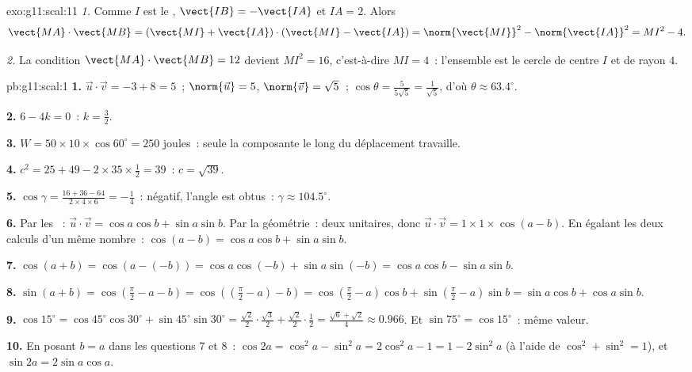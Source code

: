 \begin{solution}{exo:g11:scal:11}
\emph{1.} Comme $I$ est le , $\vect{IB} = -\vect{IA}$ et
$IA = 2$. Alors
\[
\vect{MA}\cdot\vect{MB}
= (\vect{MI} + \vect{IA})\cdot(\vect{MI} - \vect{IA})
= \norm{\vect{MI}}^2 - \norm{\vect{IA}}^2
= MI^2 - 4 .
\]

\emph{2.} La condition $\vect{MA}\cdot\vect{MB} = 12$ devient
$MI^2 = 16$, c'est-à-dire $MI = 4$~: l'ensemble est le cercle de centre
$I$ et de rayon $4$.
\end{solution}

\begin{solution}{pb:g11:scal:1}
\textbf{1.} $\vec u \cdot \vec v = -3 + 8 = 5$~;
$\norm{\vec u} = 5$, $\norm{\vec v} = \sqrt5$~;
$\cos\theta = \frac{5}{5\sqrt5} = \frac{1}{\sqrt5}$, d'où
$\theta \approx 63.4^\circ$.

\textbf{2.} $6 - 4k = 0$~: $k = \frac32$.

\textbf{3.} $W = 50 \times 10 \times \cos 60^\circ = 250$ joules~:
seule la composante le long du déplacement travaille.

\textbf{4.} $c^2 = 25 + 49 - 2 \times 35 \times \frac12 = 39$~:
$c = \sqrt{39}$.

\textbf{5.} $\cos\gamma = \frac{16 + 36 - 64}{2 \times 4
\times 6} = -\frac14$~: négatif, l'angle est obtus~:
$\gamma \approx 104.5^\circ$.

\textbf{6.} Par les ~: $\vec u \cdot \vec v = \cos a
\cos b + \sin a \sin b$. Par la géométrie~: deux 
unitaires, donc $\vec u \cdot \vec v = 1 \times 1 \times
\cos(a - b)$. En égalant les deux calculs d'un même nombre~:
$\cos(a - b) = \cos a \cos b + \sin a \sin b$.

\textbf{7.} $\cos(a + b) = \cos(a - (-b)) = \cos a \cos(-b) +
\sin a \sin(-b) = \cos a \cos b - \sin a \sin b$.

\textbf{8.} $\sin(a + b) = \cos\left(\frac\pi2 - a - b\right)
= \cos\left(\left(\frac\pi2 - a\right) - b\right)
= \cos\left(\frac\pi2 - a\right)\cos b +
\sin\left(\frac\pi2 - a\right)\sin b
= \sin a \cos b + \cos a \sin b$.

\textbf{9.} $\cos 15^\circ = \cos 45^\circ \cos 30^\circ +
\sin 45^\circ \sin 30^\circ = \frac{\sqrt2}{2} \cdot
\frac{\sqrt3}{2} + \frac{\sqrt2}{2} \cdot \frac12 =
\frac{\sqrt6 + \sqrt2}{4} \approx 0.966$. Et
$\sin 75^\circ = \cos 15^\circ$~: même valeur.

\textbf{10.} En posant $b = a$ dans les questions 7 et 8~:
$\cos 2a = \cos^2 a - \sin^2 a = 2\cos^2 a - 1 = 1 - 2\sin^2 a$
(à l'aide de $\cos^2 + \sin^2 = 1$), et
$\sin 2a = 2 \sin a \cos a$.


\end{solution}
